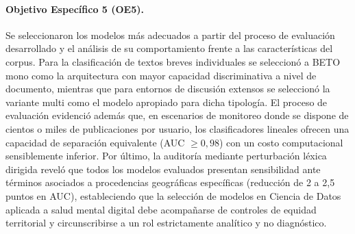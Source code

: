 \documentclass[12pt,a4paper]{article}
\begin{document}
\paragraph{Objetivo Específico 5 (OE5).}
Se seleccionaron los modelos más adecuados a partir del proceso de evaluación desarrollado y el análisis de su comportamiento frente a las características del corpus. Para la clasificación de textos breves individuales se seleccionó a BETO mono como la arquitectura con mayor capacidad discriminativa a nivel de documento, mientras que para entornos de discusión extensos se seleccionó la variante multi como el modelo apropiado para dicha tipología. El proceso de evaluación evidenció además que, en escenarios de monitoreo donde se dispone de cientos o miles de publicaciones por usuario, los clasificadores lineales ofrecen una capacidad de separación equivalente (AUC $\ge 0{,}98$) con un costo computacional sensiblemente inferior. Por último, la auditoría mediante perturbación léxica dirigida reveló que todos los modelos evaluados presentan sensibilidad ante términos asociados a procedencias geográficas específicas (reducción de 2 a 2{,}5 puntos en AUC), estableciendo que la selección de modelos en Ciencia de Datos aplicada a salud mental digital debe acompañarse de controles de equidad territorial y circunscribirse a un rol estrictamente analítico y no diagnóstico.
\end{document}
